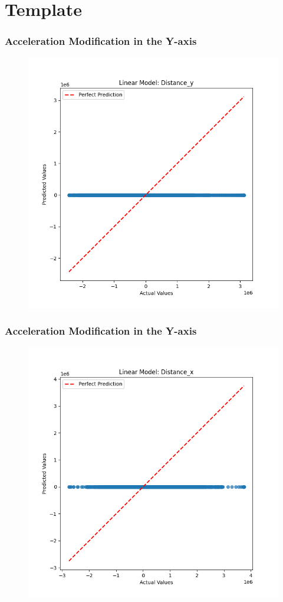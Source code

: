 
\section{Template}

\begin{frame}
  \frametitle{Acceleration Modification in the Y-axis}
  \begin{figure}
    \centering
    \includegraphics[width=0.5 \textwidth]{figures/acceleration_mod/acceleration_mod_dist_y.png}
  \end{figure}
\end{frame}


\begin{frame}
  \frametitle{Acceleration Modification in the Y-axis}
  \begin{figure}
    \centering
    \includegraphics[width=0.5 \textwidth]{figures/acceleration_mod/acceleration_mod_dist_x.png}
  \end{figure}
\end{frame}


